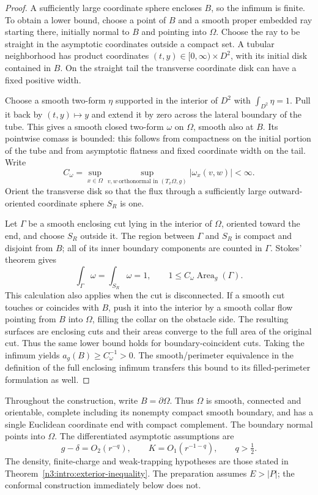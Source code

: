 \begin{proof}
A sufficiently large coordinate sphere encloses $B$, so the infimum
is finite. To obtain a lower bound, choose a point of $B$ and a smooth
proper embedded ray starting there, initially normal to $B$ and pointing
into $\Omega$. Choose the ray to be straight in the asymptotic coordinates
outside a compact set. A tubular neighborhood has product coordinates
$(t,y)\in[0,\infty)\times D^2$, with its initial disk contained in $B$.
On the straight tail the transverse coordinate disk can have a fixed
positive width.

Choose a smooth two-form $\eta$ supported in the interior of $D^2$ with
$\int_{D^2}\eta=1$. Pull it back by $(t,y)\mapsto y$ and extend it by
zero across the lateral boundary of the tube. This gives a smooth
closed two-form $\omega$ on $\Omega$, smooth also at $B$. Its pointwise
comass is bounded: this follows from compactness on the initial portion
of the tube and from asymptotic flatness and fixed coordinate width on
the tail. Write
\[
 C_\omega=\sup_{x\in \Omega}\sup_{
       v,w\ \text{orthonormal in }(T_x\Omega,g)}|\omega_x(v,w)|<\infty.
\]
Orient the transverse disk so that the flux through a sufficiently
large outward-oriented coordinate sphere $S_R$ is one.

Let $\Gamma$ be a smooth enclosing cut lying in the interior of $\Omega$,
oriented toward the end, and choose $S_R$ outside it. The region between
$\Gamma$ and $S_R$ is compact and disjoint from $B$; all of its inner
boundary components are counted in $\Gamma$. Stokes' theorem gives
\[
       \int_\Gamma\omega=\int_{S_R}\omega=1,
       \qquad 1\le C_\omega\operatorname{Area}_g(\Gamma).
\]
This calculation also applies when the cut is disconnected. If a
smooth cut touches or coincides with $B$, push it into the interior
by a smooth collar flow pointing from $B$ into $\Omega$, filling the collar on the obstacle
side. The resulting surfaces are enclosing cuts and their areas
converge to the full area of the original cut. Thus the same lower
bound holds for boundary-coincident cuts. Taking the infimum yields
$a_g(B)\ge C_\omega^{-1}>0$. The smooth/perimeter equivalence in the
definition of the full enclosing infimum transfers this bound to its
filled-perimeter formulation as well.
\end{proof}

Throughout the construction, write $B=\partial\Omega$.
Thus $\Omega$ is smooth, connected and orientable, complete including its
nonempty compact smooth boundary, and has a single Euclidean coordinate
end with compact complement. The boundary normal points into $\Omega$.
The differentiated asymptotic assumptions are
\begin{equation}\label{n3:reduction:original-decay}
 g-\delta=O_2(r^{-q}),\qquad K=O_1(r^{-1-q}),\qquad q>\tfrac12.
\end{equation}
The density, finite-charge and weak-trapping hypotheses are those stated
in Theorem~\ref{n3:intro:exterior-inequality}. The preparation assumes
$E>|P|$; the conformal construction immediately below does not.

